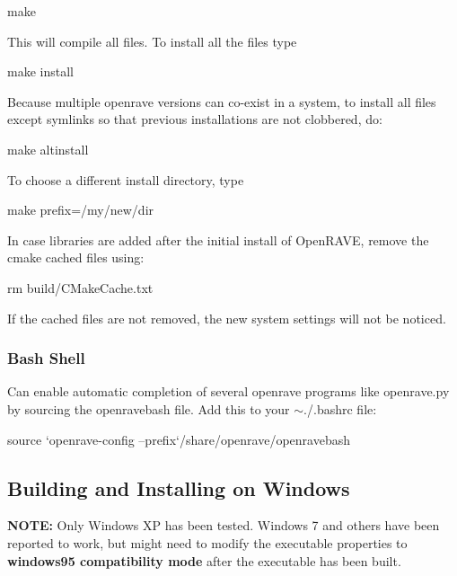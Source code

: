 \begin{DoxyVerb}
make
\end{DoxyVerb}


This will compile all files. To install all the files type

\begin{DoxyVerb}
make install
\end{DoxyVerb}


Because multiple openrave versions can co-\/exist in a system, to install all files except symlinks so that previous installations are not clobbered, do:

\begin{DoxyVerb}
make altinstall
\end{DoxyVerb}


To choose a different install directory, type

\begin{DoxyVerb}
make prefix=/my/new/dir
\end{DoxyVerb}


In case libraries are added after the initial install of OpenRAVE, remove the cmake cached files using:

\begin{DoxyVerb}
rm build/CMakeCache.txt
\end{DoxyVerb}


If the cached files are not removed, the new system settings will not be noticed.\hypertarget{installation__linux_ilinux_bash}{}\subsubsection{Bash Shell}\label{installation__linux_ilinux_bash}
Can enable automatic completion of several openrave programs like {\ttfamily openrave.py} by sourcing the {\ttfamily openravebash} file. Add this to your {\ttfamily $\sim$}./.bashrc file:

\begin{DoxyVerb}
source `openrave-config --prefix`/share/openrave/openravebash
\end{DoxyVerb}
 \hypertarget{installation_windows}{}\subsection{Building and Installing on Windows}\label{installation_windows}
{\bfseries NOTE:} Only Windows XP has been tested. Windows 7 and others have been reported to work, but might need to modify the executable properties to {\bfseries windows95 compatibility mode} after the executable has been built.

